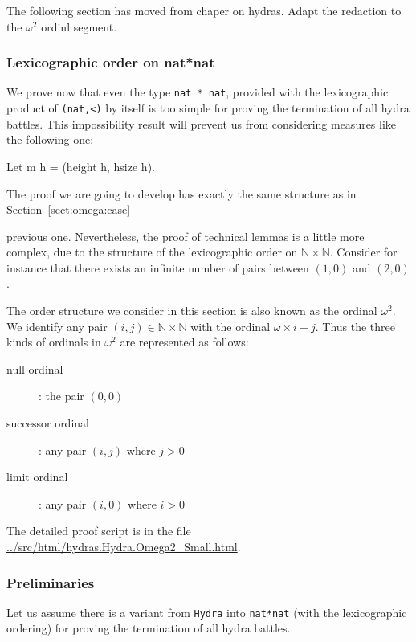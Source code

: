 \begin{todo}
The following section has moved from chaper on hydras.
Adapt the redaction to the $\omega^2$ ordinl segment.
\end{todo}


\subsubsection{Lexicographic order on \texorpdfstring{nat*nat}{nat*nat}}
\label{omega2-case}

We  prove now that even the type \texttt{nat * nat}, provided with the lexicographic product of \texttt{(nat,<)} by itself is too simple for proving the termination of all hydra battles. This impossibility result will prevent us from considering measures like the following one:


  \begin{Coqsrc}
  Let m h = (height h, hsize h).
  \end{Coqsrc}

The proof we are going to develop has exactly the same structure as in Section~\ref{sect:omega:case}


previous one. Nevertheless, the proof of technical  lemmas is a little more complex, due to 
 the structure of the lexicographic order on $\mathbb{N}\times\mathbb{N}$. 
Consider for instance that there exists an infinite number of pairs between
$(1,0)$ and $(2,0)$.


\begin{remark}
  The order structure we consider in this section is also known as the ordinal
  $\omega^2$. We identify any pair $(i,j)\in \mathbb{N}\times\mathbb{N}$ with the ordinal $\omega\times i + j$. Thus the three kinds of ordinals in $\omega^2$
  are represented as follows:
  \begin{description}
  \item[null ordinal] : the pair $(0,0)$
  \item[successor ordinal] : any pair $(i,j)$ where $j>0$
  \item[limit ordinal] : any pair $(i,0)$ where $i>0$
  \end{description}
\end{remark}

The detailed  proof script is in the file \url{../src/html/hydras.Hydra.Omega2_Small.html}.

\subsubsection{Preliminaries}
Let us assume there is a variant from \texttt{Hydra} into \texttt{nat*nat} (with the
   lexicographic ordering)  for proving the   termination of all hydra battles.

